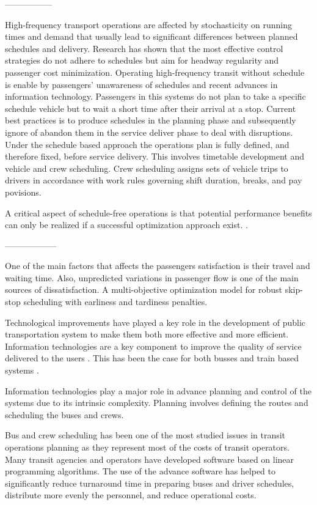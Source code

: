 \documentclass[12pt]{elsarticle}
\begin{document}
-----------------

High-frequency transport operations are affected by stochasticity on running
times and demand that usually lead to significant differences between planned
schedules and delivery. Research has shown that the most effective control
strategies do not adhere to schedules but aim for headway regularity and
passenger cost minimization. Operating high-frequency transit without
schedule is enable by passengers' unawareness of schedules and recent
advances in information technology. Passengers in this systems do not plan to
take a specific schedule vehicle but to wait a short time after their arrival
at a stop. Current best practices is to produce schedules in the planning
phase and subsequently ignore of abandon them in the service deliver phase to
deal with disruptions. Under the schedule based approach the operations plan
is fully defined, and therefore fixed, before service delivery. This involves
timetable development and vehicle and crew scheduling. Crew scheduling
assigns sets of vehicle trips to drivers in accordance with work rules
governing shift duration, breaks, and pay povisions.

A critical aspect of schedule-free operations is that potential performance
benefits can only be realized if a successful optimization approach exist.
 \cite{Sanchez2017}.

------------------

One of the main factors that affects the passengers satisfaction is their
travel and waiting time. Also, unpredicted variations in passenger flow is
one of the main sources of dissatisfaction. A multi-objective optimization
model for robust skip-stop scheduling with earliness and tardiness penalties.
\cite{Rajabighamchi2019}

Technological improvements have played a key role in the development of
public transportation system to make them both more effective and more
efficient. Information technologies are a key component to improve the
quality of service delivered to the users \cite{Hidalgo2014}. This has been
the case for both busses and train based systems
\cite{Hidalgo2014,Rajabighamchi2019}.



Information technologies play a major role in advance planning and control of
the systems due to its intrinsic complexity. Planning involves defining the
routes and scheduling the buses and crews.\cite{Hidalgo2014}

Bus and crew scheduling has been one of the most studied issues in transit
operations planning as they represent most of the costs of transit operators.
Many transit agencies and operators have developed software based on linear
programming algorithms. The use of the advance software has helped to
significantly reduce turnaround time in preparing buses and driver schedules,
distribute more evenly the personnel, and reduce operational
costs.\cite{Hidalgo2014}
\end{document}
